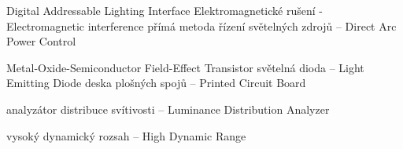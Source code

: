 


  {Digital Addressable Lighting Interface}
  {Elektromagnetické rušení - Electromagnetic interference}
 {přímá metoda řízení světelných zdrojů -- Direct Arc Power Control}

 {Metal-Oxide-Semiconductor Field-Effect Transistor}
    {světelná dioda -- Light Emitting Diode}
    {deska plošných spojů -- Printed Circuit Board}

    {analyzátor distribuce svítivosti -- Luminance Distribution Analyzer}

    {vysoký dynamický rozsah -- High Dynamic Range}